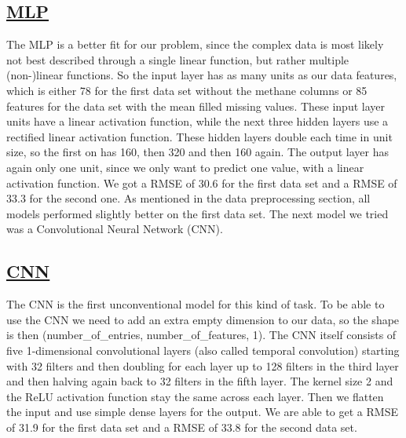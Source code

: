 \documentclass{article}
\begin{document}
\subsection{\href{https://github.com/tjayada/iANNwTF_Project/blob/main/model/07_finished_mlp_regression/07_mlp_regression(1).ipynb}{MLP}}
The MLP is a better fit for our problem, since the complex data is most likely not best described through a single linear function, but rather multiple (non-)linear functions. So the input layer has as many units as our data features, which is either 78 for the first data set without the methane columns or 85 features for the data set with the mean filled missing values. These input layer units have a linear activation function, while the next three hidden layers use a rectified linear activation function. These hidden layers double each time in unit size, so the first on has 160, then 320 and then 160 again. The output layer has again only one unit, since we only want to predict one value, with a linear activation function. We got a RMSE of 30.6 for the first data set and a RMSE of 33.3 for the second one. As mentioned in the data preprocessing section, all models performed slightly better on the first data set. The next model we tried was a Convolutional Neural Network (CNN).

\subsection{\href{https://github.com/tjayada/iANNwTF_Project/blob/main/model/08_finished_CNN_regression/08_CNN_regression(1).ipynb}{CNN}}
The CNN is the first unconventional model for this kind of task. To be able to use the CNN we need to add an extra empty dimension to our data, so the shape is then 
{\selectfont (number\_of\_entries, number\_of\_features, 1)}. The CNN itself consists of five 1-dimensional convolutional layers (also called temporal convolution) starting with 32 filters and then doubling for each layer up to 128 filters in the third layer and then halving again back to 32 filters in the fifth layer. The kernel size 2 and the ReLU activation function stay the same across each layer. Then we flatten the input and use simple dense layers for the output. We are able to get a RMSE of 31.9 for the first data set and a RMSE of 33.8 for the second data set.
\end{document}
